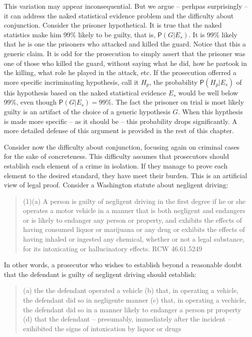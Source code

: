 \documentclass[10pt,dvipsnames,enabledeprecatedfontcommands]{scrartcl}
\newcommand{\pr}[1]{\mathsf{P}(#1)}
\begin{document}
This variation may appear inconsequential. But we argue -- perhpas
surprisingly -- it can address the naked statistical evidence problem
and the difficulty about conjunction. Consider the prisoner
hypothetical. It is true that the naked statistics make him 99\% likely
to be guilty, that is, \(\pr{G | E_s}\). It is 99\% likely that he is
one the prisoners who attacked and killed the guard. Notice that this a
generic claim. It is odd for the prosecution to simply assert that the
prisoner was one of those who killed the guard, without saying what he
did, how he partook in the killing, what role he played in the attack,
etc. If the prosecution offerred a more specific incriminating
hypothesis, call it \(H_p\), the probability \(\pr{H_p | E_{s}}\) of
this hypothesis based on the naked statistical evidence \(E_s\) would be
well below 99\%, even though \(\pr{G | E_s}=99\%\). The fact the
prisoner on trial is most likely guilty is an artifact of the choice of
a generic hypothesis \(G\). When this hypthesis is made more specific --
as it should be -- this probability drops significantly. A more detailed
defense of this argument is provided in the rest of this chapter.

Consider now the difficulty about conjunction, focusing again on
criminal cases for the sake of concreteness. This difficulty assumes
that prosecutors should establish each element of a crime in isolation.
If they manage to prove each element to the desired standard, they have
meet their burden. This is an artificial view of legal proof. Consider a
Washington statute about negligent driving:

\begin{quote}
(1)(a) A person is guilty of negligent driving in the first degree if he or she operates a motor vehicle in a manner that is both negligent and endangers or is likely to endanger any person or property, and exhibits the effects of having consumed liquor or marijuana or any drug or exhibits the effects of having inhaled or ingested any chemical, whether or not a legal substance, for its intoxicating or hallucinatory effects. RCW 46.61.5249
\end{quote}

\noindent In other words, a prosecutor who wishes to establish beyond a
reasonable doubt that the defendant is guilty of negligent driving
should establish:

\begin{quote}
(a) the the defendant operated a vehicle
(b) that, in operating a vehicle, the defendant did so in  negligente manner
(c) that, in operating a vechicle, the defendant did so in a manner likely to endanger a person pr property
(d) that the defendant -- presumably, immediately after the incident -- exihibited the signs of intoxication by liquor or drugs
\end{quote}
\end{document}
